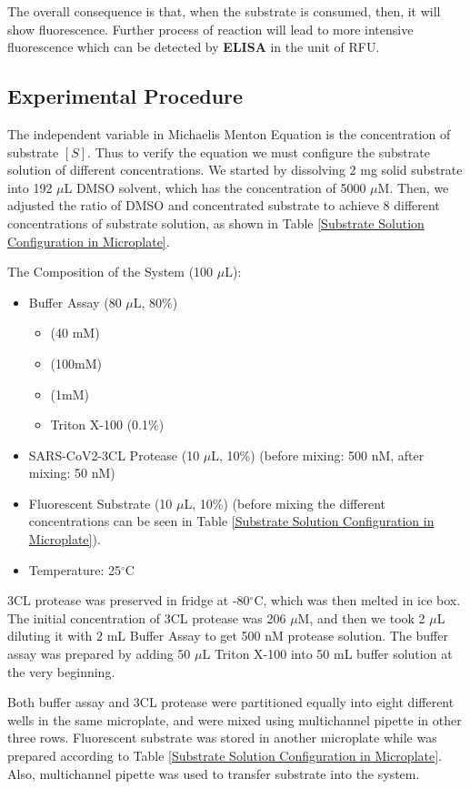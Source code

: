 \documentclass{report}
\begin{document}
The overall consequence is that, when the substrate is consumed, then, it will show fluorescence.
Further process of reaction will lead to more intensive fluorescence which can be detected by \textbf{ELISA} in the unit of RFU.

\subsection{Experimental Procedure}

The independent variable in Michaelis Menton Equation is the concentration of substrate $[S]$.
Thus to verify the equation we must configure the substrate solution of different concentrations.
We started by dissolving 2 mg solid substrate into 192 $\mu$L DMSO solvent, which has the concentration of 5000 $\mu$M.
Then, we adjusted the ratio of DMSO and concentrated substrate to achieve 8 different concentrations of substrate solution, as shown in Table \ref{Substrate Solution Configuration in Microplate}.

The Composition of the System (100 $\mu$L):
\begin{itemize}
    \item Buffer Assay (80 $\mu$L, 80\%)
    \begin{itemize}
        \item {} (40 mM)
        \item {} (100mM)
        \item {} (1mM)
        \item Triton X-100 (0.1\%)
    \end{itemize}
    \item SARS-CoV2-3CL Protease (10 $\mu$L, 10\%) (before mixing: 500 nM, after mixing: 50 nM)
    \item Fluorescent Substrate (10 $\mu$L, 10\%) (before mixing the different concentrations can be seen in Table \ref{Substrate Solution Configuration in Microplate}).
    \item Temperature: 25$^\circ$C
\end{itemize}

3CL protease was preserved in fridge at -80$^\circ$C, which was then melted in ice box.
The initial concentration of 3CL protease was 206 $\mu$M, and then we took 2 $\mu$L diluting it with 2 mL Buffer Assay to get 500 nM protease solution.
The buffer assay was prepared by adding 50 $\mu$L Triton X-100 into 50 mL buffer solution at the very beginning.

Both buffer assay and 3CL protease were partitioned equally into eight different wells in the same microplate, and were mixed using multichannel pipette in other three rows.
Fluorescent substrate was stored in another microplate while was prepared according to Table \ref{Substrate Solution Configuration in Microplate}.
Also, multichannel pipette was used to transfer substrate into the system.
\end{document}
